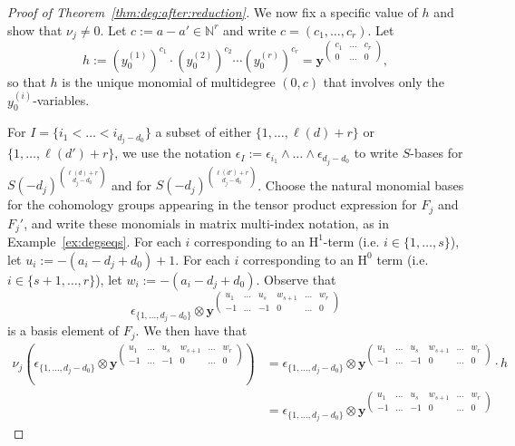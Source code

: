 \documentclass[12pt]{amsart}
\theoremstyle{definition}
\newcommand{\Hs}{\mathrm{H}}
\begin{document}
\begin{proof}[Proof of Theorem~\ref{thm:deg:after:reduction}]
We now fix a specific value of $h$ and show that $\nu_{j}\ne 0$. 
Let $c:=a-a'\in \mathbb N^r$ and write $c=(c_1, \dots, c_r)$.  Let
\[
h:=\left(y_0^{(1)} \right)^{c_1} \cdot \left(y_0^{(2)} \right)^{c_2} \cdots \left(y_0^{(r)} \right)^{c_r}
=\mathbf{y}^{\left(\begin{smallmatrix}c_1& \dots& c_r\\ 0&\dots &0\end{smallmatrix}\right)},
\]
so that $h$ is the unique monomial of multidegree $(0,c)$ that
involves only the $y_0^{(i)}$-variables.

For $I=\{i_1<\dots <i_{d_j-d_0}\}$ a subset of either $\{1, \dots, \ell(d)+r\}$ or $\{1,
\dots, \ell(d')+r\}$, we use the notation $\epsilon_I:=\epsilon_{i_1}\wedge \dots
\wedge \epsilon_{d_j-d_0}$ to write $S$-bases for 
$S(-d_j)^{\binom{\ell(d)+r}{d_j-d_0}}$ and for $S(-d_j)^{\binom{\ell(d')+r}{d_j-d_0}}$.
Choose the natural monomial bases for the
cohomology groups appearing in the tensor product expression for $F_j$ and $F_j'$, and write these monomials in matrix
multi-index notation, as in Example~\ref{ex:degseqs}.
For each $i$ corresponding to an $\Hs^1$-term (i.e. $i\in \{1, \dots, s\}$), let $u_i:=-(a_i-d_j+d_0)+1$.  For each $i$ corresponding to an $\Hs^0$ term (i.e. $i\in \{s+1, \dots, r\}$), let $w_i:=-(a_i-d_j+d_0)$.  Observe that
\[
\epsilon_{\{1, \dots, d_j-d_0\}}\otimes \mathbf{y}^{\left(\begin{smallmatrix}u_1& \dots& u_s&w_{s+1}&\dots &w_r\\ -1&\dots&-1&0&\dots&0\end{smallmatrix}\right)}
\]
is a basis element of $F_j$.  We then have that
\begin{align*}
\nu_j
\left(
\epsilon_{\{1, \dots, d_j-d_0\}}\otimes 
\mathbf{y}^{\left(\begin{smallmatrix}u_1& \dots& u_s&w_{s+1}&\dots &w_r\\ -1&\dots&-1&0&\dots&0\end{smallmatrix}\right)}
\right)
& = \epsilon_{\{1, \dots, d_j-d_0\}}\otimes 
\mathbf{y}^{\left(\begin{smallmatrix}u_1& \dots& u_s&w_{s+1}&\dots &w_r\\ -1&\dots&-1&0&\dots&0\end{smallmatrix}\right)}
\cdot h\\
& = \epsilon_{\{1, \dots, d_j-d_0\}}\otimes 
\mathbf{y}^{\left(\begin{smallmatrix}u_1& \dots& u_s&w_{s+1}&\dots &w_r\\ -1&\dots&-1&0&\dots&0\end{smallmatrix}\right)}

\end{align*}
\end{proof}
\end{document}
